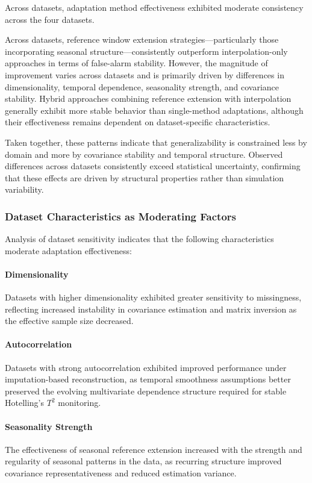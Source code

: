 Across datasets, adaptation method effectiveness exhibited moderate consistency across the four datasets.

Across datasets, reference window extension strategies—particularly those incorporating seasonal structure—consistently outperform interpolation-only approaches in terms of false-alarm stability. However, the magnitude of improvement varies across datasets and is primarily driven by differences in dimensionality, temporal dependence, seasonality strength, and covariance stability. Hybrid approaches combining reference extension with interpolation generally exhibit more stable behavior than single-method adaptations, although their effectiveness remains dependent on dataset-specific characteristics.

Taken together, these patterns indicate that generalizability is constrained less by domain and more by covariance stability and temporal structure. Observed differences across datasets consistently exceed statistical uncertainty, confirming that these effects are driven by structural properties rather than simulation variability.


\subsubsection{Dataset Characteristics as Moderating Factors}

Analysis of dataset sensitivity indicates that the following characteristics moderate adaptation effectiveness:

\paragraph{Dimensionality} Datasets with higher dimensionality exhibited greater sensitivity to missingness, reflecting increased instability in covariance estimation and matrix inversion as the effective sample size decreased.


\paragraph{Autocorrelation} Datasets with strong autocorrelation exhibited improved performance under imputation-based reconstruction, as temporal smoothness assumptions better preserved the evolving multivariate dependence structure required for stable Hotelling’s $T^2$ monitoring.

\paragraph{Seasonality Strength} The effectiveness of seasonal reference extension increased with the strength and regularity of seasonal patterns in the data, as recurring structure improved covariance representativeness and reduced estimation variance.

